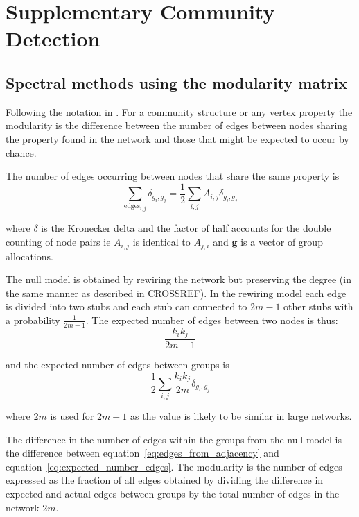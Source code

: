 \section{Supplementary Community Detection}
\subsection{Spectral methods using the modularity matrix}
\label{sec:Spectral methods description}
Following the notation in \cite{newman2018networks}. For a community structure or any vertex property the modularity is the difference between the number of edges between nodes sharing the property found in the network and those that might be expected to occur by chance.

The number of edges occurring between nodes that share the same property is
\begin{equation}
    \sum_{\textrm{edges}_{i,j}} \delta_{g_i,g_j} = \frac{1}{2} \sum_{i,j} A_{i,j} \delta_{g_i,g_j}
    \label{eq:edges_from_adjacency}
\end{equation}


where $\delta$ is the Kronecker delta and the factor of half accounts for the double counting of node pairs ie $A_{i,j}$ is identical to $A_{j,i}$ and $\mathbf{g}$ is a vector of group allocations. 

The null model is obtained by rewiring the network but preserving the degree (in the same manner as described in CROSSREF). In the rewiring model each edge is divided into two stubs and each stub can connected to ${2m-1}$ other stubs with a probability $\frac{1}{2m-1}$. The expected number of edges between two nodes is thus:
\begin{equation}
    \frac{k_i k_j}{2m-1}
\end{equation}

and the expected number of edges between groups is
\begin{equation}
    \frac{1}{2} \sum_{i,j} \frac{k_i k_j}{2m}\delta_{g_i,g_j}
    \label{eq:expected_number_edges}
\end{equation}


where $2m$ is used for $2m-1$ as the value is likely to be similar in large networks. 

The difference in the number of edges within the groups from the null model is the difference between equation~\ref{eq:edges_from_adjacency} and equation~\ref{eq:expected_number_edges}. The modularity is the number of edges expressed as the fraction of all edges obtained by dividing the difference in expected and actual edges between groups by the total number of edges in the network $2m$.

